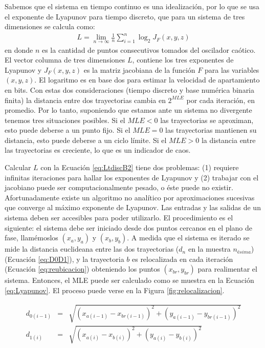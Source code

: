 Sabemos que el sistema en tiempo continuo es una idealización, por lo que se usa el exponente de Lyapunov para tiempo discreto, que para un sistema de tres dimensiones se calcula como:
%
\begin{eqnarray}
\label{eq:LtdiscB2}
	L = \lim\limits_{n \to \infty} \frac{1}{n} \sum_{i=1}^{n} \log_2 J_F(x,y,z)
\end{eqnarray}
en donde $n$ es la cantidad de puntos consecutivos tomados del oscilador caótico.
%
El vector columna de tres dimensiones $L$, contiene los tres exponentes de Lyapunov y $J_F(x,y,z)$ es la matriz jacobiana de la función $F$ para las variables $(x,y,z)$.
El logaritmo es en base dos para estimar la velocidad de apartamiento en bits.
Con estas dos consideraciones (tiempo discreto y base numérica binaria finita) la distancia entre dos trayectorias cambia en $2^{MLE}$ por cada iteración, en promedio.
Por lo tanto, suponiendo que estamos ante un sistema no divergente tenemos tres situaciones posibles.
Si el $MLE<0$ las trayectorias se aproximan, esto puede deberse a un punto fijo.
Si el $MLE=0$ las trayectorias mantienen su distancia, esto puede deberse a un ciclo límite.
Si el $MLE>0$ la distancia entre las trayectorias es creciente, lo que es un indicador de caos.

Calcular $L$ con la Ecuación \ref{eq:LtdiscB2} tiene dos problemas: (1) requiere infinitas iteraciones para hallar los exponentes de Lyapunov y (2) trabajar con el jacobiano puede ser computacionalmente pesado, o éste puede no existir.
Afortunadamente existe un algoritmo no analítico por aproximaciones sucesivas que converge al máximo exponente de Lyapunov.
Las entradas y las salidas de un sistema deben ser accesibles para poder utilizarlo.
El procedimiento es el siguiente: el sistema debe ser iniciado desde dos puntos cercanos en el plano de fase, llamémoslos $(x_a,y_a)$ y $(x_b,y_b)$.
A medida que el sistema es iterado se mide la distancia euclideana entre las dos trayectorias ($d_n$ en la muestra $n_{ésima}$) (Ecuación \ref{eq:D0D1}), y la trayectoria $b$ es relocalizada en cada iteración (Ecuación \ref{eq:reubicacion}) obteniendo los puntos $(x_{br},y_{br})$ para realimentar el sistema.
Entonces, el MLE puede ser calculado como se muestra en la Ecuación \ref{eq:Lyapunov}.
El proceso puede verse en la Figura \ref{fig:relocalizacion}.

\begin{eqnarray}\label{eq:D0D1}
d_{0(i-1)}&=& \sqrt{(x_{a(i-1)}-x_{br(i-1)})^2+(y_{a(i-1)}-y_{br(i-1)})^2}\nonumber\\
d_{1(i)}&=& \sqrt{(x_{a(i)}-x_{b(i)})^2+(y_{a(i)}-y_{b(i)})^2}\\
\nonumber
\end{eqnarray}

